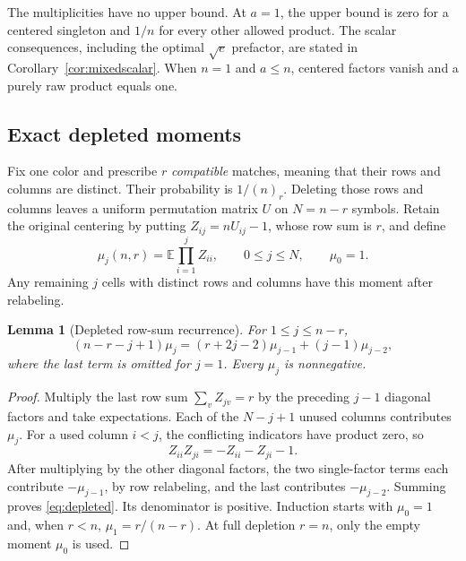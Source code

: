 \documentclass[11pt]{article}
\newtheorem{lemma}[theorem]{Lemma}
\theoremstyle{definition}
\theoremstyle{remark}
\newcommand{\E}{\mathbb E}
\newcommand{\1}{\mathbf 1}
\begin{document}
The multiplicities have no upper bound. At $a=1$, the upper bound is zero for a centered singleton and $1/n$ for every other allowed product. The scalar consequences, including the optimal $\sqrt e$ prefactor, are stated in Corollary~\ref{cor:mixedscalar}. When $n=1$ and $a\le n$, centered factors vanish and a purely raw product equals one.

\subsection{Exact depleted moments}

Fix one color and prescribe $r$ \emph{compatible} matches, meaning that their rows and columns are distinct. Their probability is $1/(n)_r$. Deleting those rows and columns leaves a uniform permutation matrix $U$ on $N=n-r$ symbols. Retain the original centering by putting $Z_{ij}=nU_{ij}-1$, whose row sum is $r$, and define
\[
\mu_j(n,r)=\E\prod_{i=1}^j Z_{ii},\qquad 0\le j\le N,\qquad \mu_0=1.
\]
Any remaining $j$ cells with distinct rows and columns have this moment after relabeling.

\begin{lemma}[Depleted row-sum recurrence]\label{lem:depleted}
For $1\le j\le n-r$,
\begin{equation}\label{eq:depleted}
(n-r-j+1)\mu_j=(r+2j-2)\mu_{j-1}+(j-1)\mu_{j-2},
\end{equation}
where the last term is omitted for $j=1$. Every $\mu_j$ is nonnegative.
\end{lemma}
\begin{proof}
Multiply the last row sum $\sum_v Z_{jv}=r$ by the preceding $j-1$ diagonal factors and take expectations. Each of the $N-j+1$ unused columns contributes $\mu_j$. For a used column $i<j$, the conflicting indicators have product zero, so
\[
Z_{ii}Z_{ji}=-Z_{ii}-Z_{ji}-1.
\]
After multiplying by the other diagonal factors, the two single-factor terms each contribute $-\mu_{j-1}$, by row relabeling, and the last contributes $-\mu_{j-2}$. Summing proves \eqref{eq:depleted}. Its denominator is positive. Induction starts with $\mu_0=1$ and, when $r<n$, $\mu_1=r/(n-r)$. At full depletion $r=n$, only the empty moment $\mu_0$ is used.
\end{proof}
\end{document}
